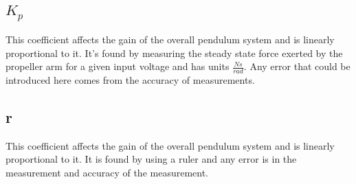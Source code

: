 \documentclass[a4paper, 11pt, compsoc]{IEEEtran}
\begin{document}
        \subsection{$K_p$}
            This coefficient affects the gain of the overall pendulum system and is linearly proportional to it. It's found by measuring the steady state force exerted by the propeller arm for a given input voltage and has units $\frac{Ns}{rad}$. Any error that could be introduced here comes from the accuracy of measurements.
        \subsection{r}
            This coefficient affects the gain of the overall pendulum system and is linearly proportional to it. It is found by using a ruler and any error is in the measurement and accuracy of the measurement.
\end{document}
